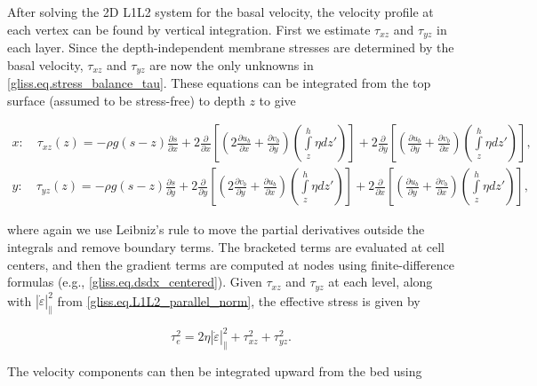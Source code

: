 {After solving the 2D L1L2 system for the basal velocity, the velocity profile at each vertex
can be found by vertical integration. First we estimate
$\tau_{xz}$ and $\tau_{yz}$ in each layer.  Since the depth-independent membrane stresses
are determined by the basal velocity, $\tau_{xz}$ and $\tau_{yz}$ are now the
only unknowns in \eqref{gliss.eq.stress_balance_tau}.  These equations can be integrated
from the top surface (assumed to be stress-free) to depth $z$ to give

\begin{equation}
  \begin{split}
    x: \quad {{\tau }_{xz}}(z) = -\rho g(s-z)\frac{\partial s}{\partial x} 
    + 2\frac{\partial }{\partial x}\left[ \left( 2\frac{\partial {{u}_{b}}}{\partial x}+\frac{\partial {{v}_{b}}}{\partial y} \right)
      \left( \int\limits_{z}^{h}{\eta d{z}'} \right) \right] 
    + 2\frac{\partial }{\partial y}\left[ \left(  \frac{\partial {{u}_{b}}}{\partial y}+\frac{\partial {{v}_{b}}}{\partial x} \right)
      \left( \int\limits_{z}^{h}{\eta d{z}'} \right) \right], \\
    y: \quad {{\tau }_{yz}}(z) = -\rho g(s-z)\frac{\partial s}{\partial y} 
    + 2\frac{\partial }{\partial y}\left[ \left( 2\frac{\partial {{v}_{b}}}{\partial y}+\frac{\partial {{u}_{b}}}{\partial x} \right)
      \left( \int\limits_{z}^{h}{\eta d{z}'} \right) \right] 
    + 2\frac{\partial }{\partial x}\left[ \left(  \frac{\partial {{u}_{b}}}{\partial y}+\frac{\partial {{v}_{b}}}{\partial x} \right)
      \left( \int\limits_{z}^{h}{\eta d{z}'} \right) \right],
  \end{split}
\end{equation}

\noindent
where again we use Leibniz's rule to move the partial derivatives outside the integrals
and remove boundary terms.
The bracketed terms are evaluated at cell centers, and then the gradient terms are 
computed at nodes using finite-difference formulas (e.g., \eqref{gliss.eq.dsdx_centered}).
Given $\tau_{xz}$ and $\tau_{yz}$ at each level, along with
$\left| \dot{\varepsilon } \right|_{\parallel }^{2}$ from \eqref{gliss.eq.L1L2_parallel_norm},
the effective stress is given by

\begin{equation}
  \tau_{e}^{2} = 2 \eta \left| {\dot{\varepsilon }} \right|_{\parallel }^{2} + \tau_{xz}^{2} + \tau_{yz}^{2}.
\end{equation}

\noindent
The velocity components can then be integrated upward from the bed using

}
